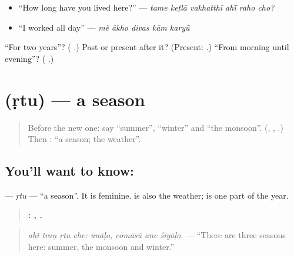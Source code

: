 \begin{itemize}
\raggedright
  \item \textquotedblleft{}How long have you lived here?\textquotedblright{} — \emph{tame keṭlā vakhatthī ahī̃ raho cho?}
  \item \textquotedblleft{}I worked all day\textquotedblright{} — \emph{mẽ ākho divas kām karyũ}
\end{itemize}

\begin{tcolorbox}[breakable,colback=teal!4,colframe=teal!35!black,title={Before you move on}]
\textquotedblleft{}For two years\textquotedblright{}? (\textbf{ }.) Past or present after it? (Present: \textbf{ }.) \textquotedblleft{}From morning until evening\textquotedblright{}? (\textbf{  }.)
\end{tcolorbox}
\section[\texorpdfstring{\gu{ઋતુ} (ṛtu)}{ઋતુ (ṛtu)}]{ (ṛtu) — a season}

\label{lesson:GU-C282-rtu}



\begin{quote}
Before the new one: say \textquotedblleft{}summer\textquotedblright{}, \textquotedblleft{}winter\textquotedblright{} and \textquotedblleft{}the monsoon\textquotedblright{}. (\textbf{}, \textbf{}, \textbf{}.) Then \textbf{}: \textquotedblleft{}a season; the weather\textquotedblright{}.
\end{quote}

\subsection*{You'll want to know: }
\textbf{} — \emph{ṛtu} — \textquotedblleft{}a season\textquotedblright{}. It is feminine. \textbf{} is also the weather; \textbf{} is one part of the year.

\begin{quote}
\textbf{   : ,   .}
\end{quote}

\begin{quote}
\emph{ahī̃ traṇ ṛtu che: unāḷo, comāsũ ane śiyāḷo.} — \textquotedblleft{}There are three seasons here: summer, the monsoon and winter.\textquotedblright{}
\end{quote}

